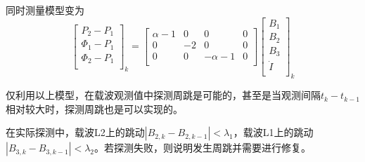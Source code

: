 同时测量模型变为
$$
\begin{bmatrix}
P_{2}-P_{1}\\
\Phi_{1}-P_{1}\\
\Phi_{2}-P_{1}\\
\end{bmatrix}_{k}
=\begin{bmatrix}
\alpha-1&0&0&0\\
0&-2&0&0\\
0&0&-\alpha-1&0\\
\end{bmatrix}
\begin{bmatrix}
B_{1}\\
B_{2}\\
B_{3}\\
\dot{I}\\
\end{bmatrix}_{k}
$$

仅利用以上模型，在载波观测值中探测周跳是可能的，甚至是当观测间隔$t_{k}-t_{k-1}$ 相对较大时，探测周跳也是可以实现的。

在实际探测中，载波L2上的跳动$|B_{2,k}-B_{2,k-1}|<\lambda_{1}$，载波L1上的跳动$|B_{3,k}-B_{3,k-1}|<\lambda_{2}$。若探测失败，则说明发生周跳并需要进行修复。